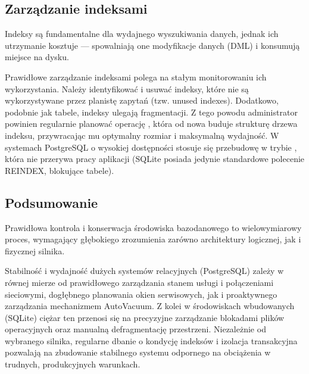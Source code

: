 \documentclass[letterpaper,10pt,polish]{sphinxmanual}
\begin{document}
\subsection{Zarządzanie indeksami}
\label{\detokenize{rozdzia_u0142_2/rozdzia_u0142_23/index:zarzadzanie-indeksami}}
\sphinxAtStartPar
Indeksy są fundamentalne dla wydajnego wyszukiwania danych, jednak ich utrzymanie kosztuje — spowalniają one modyfikacje danych (DML) i konsumują miejsce na dysku.

\sphinxAtStartPar
Prawidłowe zarządzanie indeksami polega na stałym monitorowaniu ich wykorzystania. Należy identyfikować i usuwać indeksy, które nie są wykorzystywane przez planistę zapytań (tzw. unused indexes). Dodatkowo, podobnie jak tabele, indeksy ulegają fragmentacji. Z tego powodu administrator powinien regularnie planować operację , która od nowa buduje strukturę drzewa indeksu, przywracając mu optymalny rozmiar i maksymalną wydajność. W systemach PostgreSQL o wysokiej dostępności stosuje się przebudowę w trybie , która nie przerywa pracy aplikacji (SQLite posiada jedynie standardowe polecenie REINDEX, blokujące tabele).


\subsection{Podsumowanie}
\label{\detokenize{rozdzia_u0142_2/rozdzia_u0142_23/index:podsumowanie}}
\sphinxAtStartPar
Prawidłowa kontrola i konserwacja środowiska bazodanowego to wielowymiarowy proces, wymagający głębokiego zrozumienia zarówno architektury logicznej, jak i fizycznej silnika.

\sphinxAtStartPar
Stabilność i wydajność dużych systemów relacyjnych (PostgreSQL) zależy w równej mierze od prawidłowego zarządzania stanem usługi i połączeniami sieciowymi, dogłębnego planowania okien serwisowych, jak i proaktywnego zarządzania mechanizmem AutoVacuum. Z kolei w środowiskach wbudowanych (SQLite) ciężar ten przenosi się na precyzyjne zarządzanie blokadami plików operacyjnych oraz manualną defragmentację przestrzeni. Niezależnie od wybranego silnika, regularne dbanie o kondycję indeksów i izolacja transakcyjna pozwalają na zbudowanie stabilnego systemu odpornego na obciążenia w trudnych, produkcyjnych warunkach.

\sphinxstepscope
\end{document}
